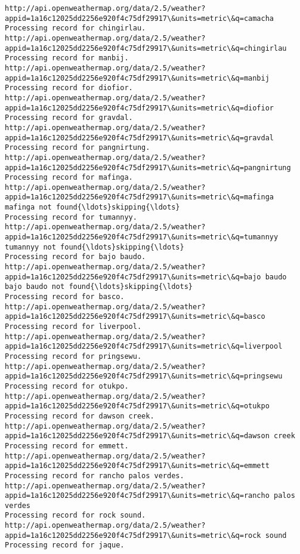 \documentclass[11pt]{article}
\begin{document}
\begin{Verbatim}[commandchars=\\\{\}]
http://api.openweathermap.org/data/2.5/weather?appid=1a16c12025dd2256e920f4c75df29917\&units=metric\&q=camacha
Processing record for chingirlau.
http://api.openweathermap.org/data/2.5/weather?appid=1a16c12025dd2256e920f4c75df29917\&units=metric\&q=chingirlau
Processing record for manbij.
http://api.openweathermap.org/data/2.5/weather?appid=1a16c12025dd2256e920f4c75df29917\&units=metric\&q=manbij
Processing record for diofior.
http://api.openweathermap.org/data/2.5/weather?appid=1a16c12025dd2256e920f4c75df29917\&units=metric\&q=diofior
Processing record for gravdal.
http://api.openweathermap.org/data/2.5/weather?appid=1a16c12025dd2256e920f4c75df29917\&units=metric\&q=gravdal
Processing record for pangnirtung.
http://api.openweathermap.org/data/2.5/weather?appid=1a16c12025dd2256e920f4c75df29917\&units=metric\&q=pangnirtung
Processing record for mafinga.
http://api.openweathermap.org/data/2.5/weather?appid=1a16c12025dd2256e920f4c75df29917\&units=metric\&q=mafinga
mafinga not found{\ldots}skipping{\ldots}
Processing record for tumannyy.
http://api.openweathermap.org/data/2.5/weather?appid=1a16c12025dd2256e920f4c75df29917\&units=metric\&q=tumannyy
tumannyy not found{\ldots}skipping{\ldots}
Processing record for bajo baudo.
http://api.openweathermap.org/data/2.5/weather?appid=1a16c12025dd2256e920f4c75df29917\&units=metric\&q=bajo baudo
bajo baudo not found{\ldots}skipping{\ldots}
Processing record for basco.
http://api.openweathermap.org/data/2.5/weather?appid=1a16c12025dd2256e920f4c75df29917\&units=metric\&q=basco
Processing record for liverpool.
http://api.openweathermap.org/data/2.5/weather?appid=1a16c12025dd2256e920f4c75df29917\&units=metric\&q=liverpool
Processing record for pringsewu.
http://api.openweathermap.org/data/2.5/weather?appid=1a16c12025dd2256e920f4c75df29917\&units=metric\&q=pringsewu
Processing record for otukpo.
http://api.openweathermap.org/data/2.5/weather?appid=1a16c12025dd2256e920f4c75df29917\&units=metric\&q=otukpo
Processing record for dawson creek.
http://api.openweathermap.org/data/2.5/weather?appid=1a16c12025dd2256e920f4c75df29917\&units=metric\&q=dawson creek
Processing record for emmett.
http://api.openweathermap.org/data/2.5/weather?appid=1a16c12025dd2256e920f4c75df29917\&units=metric\&q=emmett
Processing record for rancho palos verdes.
http://api.openweathermap.org/data/2.5/weather?appid=1a16c12025dd2256e920f4c75df29917\&units=metric\&q=rancho palos verdes
Processing record for rock sound.
http://api.openweathermap.org/data/2.5/weather?appid=1a16c12025dd2256e920f4c75df29917\&units=metric\&q=rock sound
Processing record for jaque.

\end{Verbatim}
\end{document}
